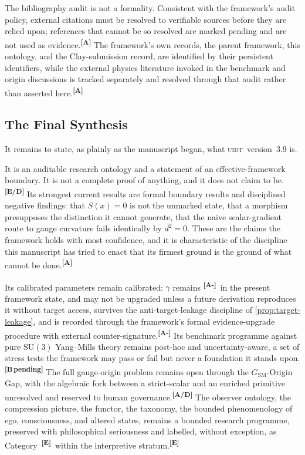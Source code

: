 \documentclass[12pt,a4paper,twoside]{article}
\theoremstyle{plain}
\theoremstyle{definition}
\theoremstyle{remark}
\newcommand{\UIDT}{\textsc{uidt}}
\newcommand{\catmark}[1]{\textsuperscript{\textsf{\textbf{[#1]}}}}
\begin{document}
The bibliography audit is not a formality. Consistent with the framework's audit policy, external citations must be resolved to verifiable sources before they are relied upon; references that cannot be so resolved are marked pending and are not used as evidence.\catmark{A} The framework's own records, the parent framework, this ontology, and the Clay-submission record, are identified by their persistent identifiers, while the external physics literature invoked in the benchmark and origin discussions is tracked separately and resolved through that audit rather than asserted here.\catmark{A}

\subsection{The Final Synthesis}
\label{subsec:final-paragraph}

It remains to state, as plainly as the manuscript began, what \UIDT\ version~3.9 is.

It is an auditable research ontology and a statement of an effective-framework boundary. It is not a complete proof of anything, and it does not claim to be.\catmark{E/D} Its strongest current results are formal boundary results and disciplined negative findings: that $S(x)=0$ is not the unmarked state, that a morphism presupposes the distinction it cannot generate, that the naive scalar-gradient route to gauge curvature fails identically by $d^2=0$. These are the claims the framework holds with most confidence, and it is characteristic of the discipline this manuscript has tried to enact that its firmest ground is the ground of what cannot be done.\catmark{A}

Its calibrated parameters remain calibrated: $\gamma$ remains \catmark{A-}\ in the present framework state, and may not be upgraded unless a future derivation reproduces it without target access, survives the anti-target-leakage discipline of \cref{prop:target-leakage}, and is recorded through the framework's formal evidence-upgrade procedure with external counter-signature.\catmark{A-} Its benchmark programme against pure $\mathrm{SU}(3)$ Yang--Mills theory remains post-hoc and uncertainty-aware, a set of stress tests the framework may pass or fail but never a foundation it stands upon.\catmark{B\,pending} The full gauge-origin problem remains open through the $G_{\mathrm{SM}}$-Origin Gap, with the algebraic fork between a strict-scalar and an enriched primitive unresolved and reserved to human governance.\catmark{A/D} The observer ontology, the compression picture, the functor, the taxonomy, the bounded phenomenology of ego, consciousness, and altered states, remains a bounded research programme, preserved with philosophical seriousness and labelled, without exception, as Category~\catmark{E}\ within the interpretive stratum.\catmark{E}
\end{document}

